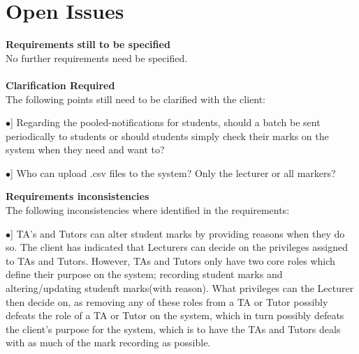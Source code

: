 \documentclass[12pt, a4paper]{scrartcl}
\newcommand{\tab}[1]{\hspace{.05\textwidth}\rlap{#1}}
\begin{document}
		\section{Open Issues}
		\textbf{Requirements still to be specified}\\
		No further requirements need be specified.\\
		\vspace{0.05cm}\\
		\textbf{Clarification Required}\\
		The following points still need to be clarified with the client:
		\begin{description}
			\item \tab [$\bullet$] Regarding the pooled-notifications for students, should a batch be sent periodically to students or should students simply check their marks on the system when they need and want to?
			\item \tab [$\bullet$] Who can upload .csv files to the system? Only the lecturer or all markers?
		\end{description}
		\vspace{0.3cm}
		\textbf{Requirements inconsistencies}\\
		The following inconsistencies where identified in the requirements:
		\begin{description}			
			\item \tab [$\bullet$] TA’s and Tutors can alter student marks by providing reasons when they do so. The client has indicated that Lecturers can decide on the privileges assigned to TAs and Tutors. However, TAs and Tutors only have two core roles which define their purpose on the system; recording student marks and altering/updating studenft marks(with reason). What privileges can the Lecturer then decide on, as removing any of these roles from a TA or Tutor possibly defeats the role of a TA or Tutor on the system, which in turn possibly defeats the client’s purpose for the system, which is to have the TAs and Tutors deals with as much of the mark recording as possible.
		\end{description}
		\pagebreak
\end{document}
